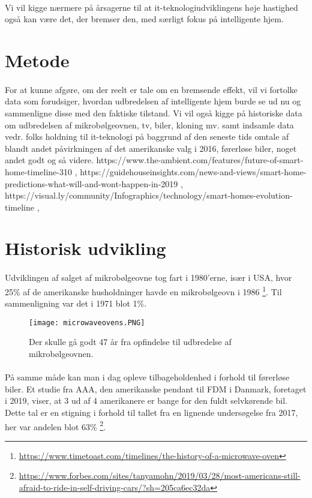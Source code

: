 \documentclass{article}
\begin{document}
\paragraph{}
Vi vil kigge nærmere på årsagerne til at it-teknologiudviklingens høje hastighed også kan være det, der bremser den, med særligt fokus på intelligente hjem.
\section{Metode}
\paragraph{}
For at kunne afgøre, om der reelt er tale om en bremsende effekt, vil vi fortolke 
data som forudsiger, hvordan udbredelsen af intelligente hjem burde se ud nu og 
sammenligne disse med den faktiske tilstand.
Vi vil også kigge på historiske data om udbredelsen af mikrobølgeovnen, tv, biler, kloning mv. samt indsamle data vedr. folks holdning til it-teknologi på baggrund af den seneste tids omtale af blandt andet påvirkningen af det amerikanske valg i 2016, førerløse biler, noget andet godt og så videre.
https://www.the-ambient.com/features/future-of-smart-home-timeline-310 , https://guidehouseinsights.com/news-and-views/smart-home-predictions-what-will-and-wont-happen-in-2019 , https://visual.ly/community/Infographics/technology/smart-homes-evolution-timeline , 
\section{Historisk udvikling}
\paragraph{}
Udviklingen af salget af mikrobølgeovne tog fart i 1980'erne, især i USA, hvor 25\% af de amerikanske husholdninger havde en mikrobølgeovn i 1986 \footnote{\url{https://www.timetoast.com/timelines/the-history-of-a-microwave-oven}}.
Til sammenligning var det i 1971 blot 1\%.
\begin{figure}[htb]
    \centering
    \texttt{[image: microwaveovens.PNG]}
    \caption{Der skulle gå godt 47 år fra opfindelse til udbredelse af mikrobølgeovnen.}
    \label{fig:microwaveovens}
\end{figure}
\paragraph{}
På samme måde kan man i dag opleve tilbageholdenhed i forhold til førerløse biler. Et studie fra AAA, den amerikanske pendant
til FDM i Danmark, foretaget i 2019, viser, at 3 ud af 4 amerikanere er bange for den fuldt selvkørende bil.
Dette tal er en stigning i forhold til tallet fra en lignende undersøgelse fra 2017, her var andelen blot 63\% \footnote{\url{https://www.forbes.com/sites/tanyamohn/2019/03/28/most-americans-still-afraid-to-ride-in-self-driving-cars/?sh=205ca6ec32da}}.
\end{document}
